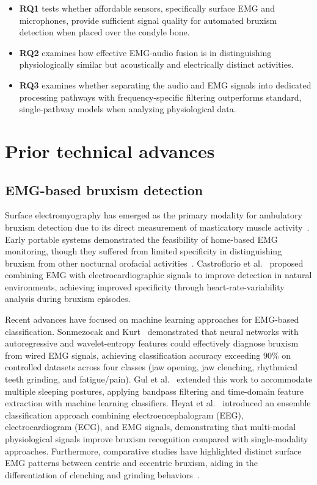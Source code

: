 \documentclass[pdflatex,sn-nature,iicol]{sn-jnl}
\newcommand{\rev}[1]{\textcolor{black}{#1}}
\begin{document}
\begin{itemize}
    \item \textbf{RQ1} tests whether affordable sensors, specifically surface EMG and microphones, provide sufficient signal quality for \rev{automated} bruxism detection when placed over the condyle bone.
    \item \textbf{RQ2} examines how effective EMG-audio fusion is in distinguishing physiologically similar but acoustically and electrically distinct activities.
    \item \textbf{RQ3} examines whether separating the audio and EMG signals into dedicated processing pathways with frequency-specific filtering outperforms standard, single-pathway models when analyzing physiological data.
\end{itemize}


\section{Prior technical advances}

\subsection{EMG-based bruxism detection}

Surface electromyography has emerged as the primary modality for ambulatory bruxism detection due to its direct measurement of masticatory muscle activity~\cite{raez2006techniques}. Early portable systems demonstrated the feasibility of home-based EMG monitoring, though they suffered from limited specificity in distinguishing bruxism from other nocturnal orofacial activities~\cite{stuginski2016detection}. Castroflorio et al.~\cite{castroflorio2013use} proposed combining EMG with electrocardiographic signals to improve detection in natural environments, achieving improved specificity through heart-rate-variability analysis during bruxism episodes.

Recent advances have focused on machine learning approaches for EMG-based classification. Sonmezocak and Kurt~\cite{sonmezocak2021detection} demonstrated that neural networks with autoregressive and wavelet-entropy features could effectively diagnose bruxism from wired EMG signals, achieving classification accuracy exceeding 90\% on controlled datasets across four classes (jaw opening, jaw clenching, rhythmical teeth grinding, and fatigue/pain). Gul et al.~\cite{gul2024advanced} extended this work to accommodate multiple sleeping postures, applying bandpass filtering and time-domain feature extraction with machine learning classifiers. Heyat et al.~\cite{heyat2020computational} introduced an ensemble classification approach combining electroencephalogram (EEG), electrocardiogram (ECG), and EMG signals, demonstrating that multi-modal physiological signals improve bruxism recognition compared with single-modality approaches. Furthermore, comparative studies have highlighted distinct surface EMG patterns between centric and eccentric bruxism, aiding in the differentiation of clenching and grinding behaviors~\cite{lan2022comparative}.
\end{document}
